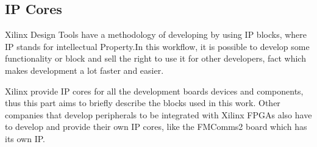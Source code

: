 \subsection{IP Cores}

Xilinx Design Tools have a methodology of developing by using IP blocks, where IP
stands for intellectual Property.In this workflow, it is possible to develop some
functionality or block and sell the right to use it for other developers, fact
which makes development a lot faster and easier.

Xilinx provide IP cores for all the development boards devices and components,
thus this part aims to briefly describe the blocks used in this work. Other
companies that develop peripherals to be integrated with Xilinx FPGAs also have
to develop and provide their own IP cores, like the FMComms2 board which has its
own IP.


